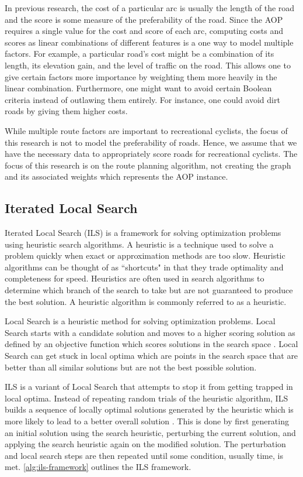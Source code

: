 \documentclass[honors]{union-cs-thesis}
\begin{document}
In previous research, the cost of a particular arc is usually the length of the road and the score is some measure of the preferability of the road. Since the AOP requires a single value for the cost and score of each arc, computing costs and scores as linear combinations of different features is a one way to model multiple factors. For example, a particular road's cost might be a combination of its length, its elevation gain, and the level of traffic on the road. This allows one to give certain factors more importance by weighting them more heavily in the linear combination. Furthermore, one might want to avoid certain Boolean criteria instead of outlawing them entirely. For instance, one could avoid dirt roads by giving them higher costs.

While multiple route factors are important to recreational cyclists, the focus of this research is not to model the preferability of roads. Hence, we assume that we have the necessary data to appropriately score roads for recreational cyclists. The focus of this research is on the route planning algorithm, not creating the graph and its associated weights which represents the AOP instance.

\subsection{Iterated Local Search}
\label{sec:ils}
Iterated Local Search (ILS) is a framework for solving optimization problems using heuristic search algorithms. A heuristic is a technique used to solve a problem quickly when exact or approximation methods are too slow. Heuristic algorithms can be thought of as ``shortcuts" in that they trade optimality and completeness for speed. Heuristics are often used in search algorithms to  determine which branch of the search to take but are not guaranteed to produce the best solution. A heuristic algorithm is commonly referred to as a heuristic.

Local Search is a heuristic method for solving optimization problems. Local Search starts with a candidate solution and moves to a higher scoring solution as defined by an objective function which scores solutions in the search space \cite{gendreau2010handbook}. Local Search can get stuck in local optima which are points in the search space that are better than all similar solutions but are not the best possible solution.

ILS is a variant of Local Search that attempts to stop it from getting trapped in local optima. Instead of repeating random trials of the heuristic algorithm, ILS builds a sequence of locally optimal solutions generated by the heuristic which is more likely to lead to a better overall solution \cite{gendreau2010handbook}. This is done by first generating an initial solution using the search heuristic, perturbing the current solution, and applying the search heuristic again on the modified solution. The perturbation and local search steps are then repeated until some condition, usually time, is met. \cref{alg:ils-framework} outlines the ILS framework.
\end{document}
